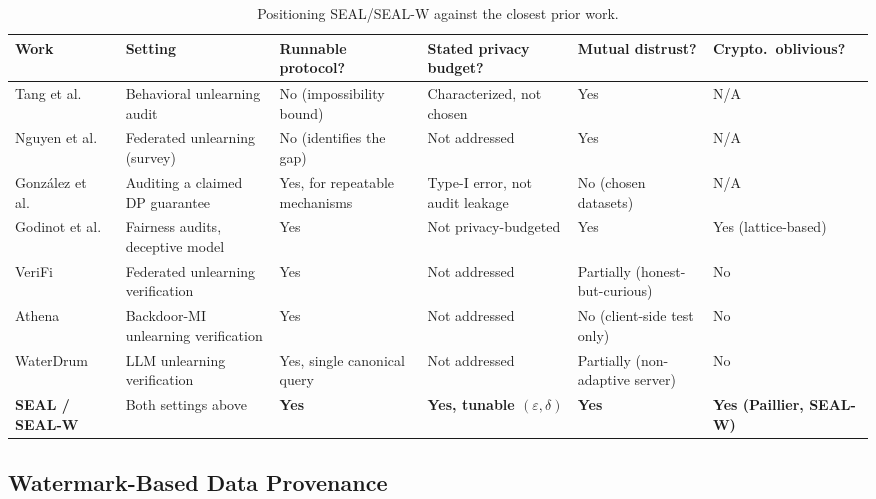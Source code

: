 \documentclass[10pt,journal,compsoc]{IEEEtran}
\begin{document}
\begin{table}[t]
\centering
\footnotesize
\caption{Positioning SEAL/SEAL-W against the closest prior work.}
\label{tab:relatedwork}
\begin{tabular}{@{}p{}p{}p{}p{}p{}p{}@{}}
\toprule
Work & Setting & Runnable protocol? & Stated privacy budget? & Mutual distrust? & Crypto.\ oblivious? \\
\midrule
Tang et al.\ \cite{tang2026geometric} & Behavioral unlearning audit & No (impossibility bound) & Characterized, not chosen & Yes & N/A \\
Nguyen et al.\ \cite{nguyen2025veriful} & Federated unlearning (survey) & No (identifies the gap) & Not addressed & Yes & N/A \\
González et al.\ \cite{gonzalez2025sequential} & Auditing a claimed DP guarantee & Yes, for repeatable mechanisms & Type-I error, not audit leakage & No (chosen datasets) & N/A \\
Godinot et al.\ \cite{godinot2026respir} & Fairness audits, deceptive model & Yes & Not privacy-budgeted & Yes & Yes (lattice-based) \\
VeriFi \cite{gao2024verifi} & Federated unlearning verification & Yes & Not addressed & Partially (honest-but-curious) & No \\
Athena \cite{sommer2022athena} & Backdoor-MI unlearning verification & Yes & Not addressed & No (client-side test only) & No \\
WaterDrum \cite{lu2026waterdrum} & LLM unlearning verification & Yes, single canonical query & Not addressed & Partially (non-adaptive server) & No \\
\textbf{SEAL / SEAL-W} & Both settings above & \textbf{Yes} & \textbf{Yes, tunable $(\varepsilon,\delta)$} & \textbf{Yes} & \textbf{Yes (Paillier, SEAL-W)} \\
\bottomrule
\end{tabular}
\end{table}

\subsection{Watermark-Based Data Provenance}
\end{document}
